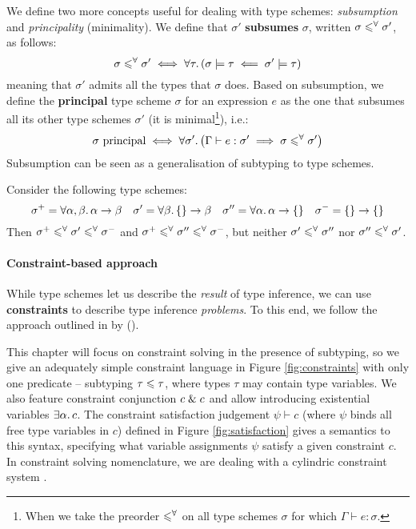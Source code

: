 We define two more concepts useful for dealing with type schemes: \emph{subsumption} and \emph{principality} (minimality). We define that $\sigma'$ \textbf{subsumes} $\sigma$, written $\sigma \leqslant^\forall \sigma'$, as follows:
$$ \sigma \leqslant^\forall \sigma' \iff \forall \tau \ldotp (\sigma \models \tau \impliedby \sigma' \models \tau) $$
meaning that $\sigma'$ admits all the types that $\sigma$ does.
Based on subsumption, we define the \textbf{principal} type scheme $\sigma$ for an expression $e$ as the one that subsumes all its other type schemes $\sigma'$ (it is minimal\footnote{When we take the preorder $\leqslant^\forall$ on all type schemes $\sigma$ for which $\Gamma \vdash e : \sigma$.}), i.e.\@:
$$ \sigma\text{ principal} \iff \forall \sigma' \ldotp \left( \Gamma \vdash e : \sigma' \implies \sigma \subsume \sigma' \right) $$
Subsumption can be seen as a generalisation of subtyping to type schemes.
\begin{example}
Consider the following type schemes:
$$    \sigma^+ = \forall \alpha, \beta \ldotp \alpha \to \beta
\quad \sigma' = \forall \beta \ldotp \flrec{} \to \beta 
\quad \sigma'' = \forall \alpha \ldotp \alpha \to \flrec{} 
\quad \sigma^- = \flrec{} \to \flrec{} $$
Then $\sigma^+ \leqslant^\forall \sigma' \leqslant^\forall \sigma^-$ and $\sigma^+ \leqslant^\forall \sigma'' \leqslant^\forall \sigma^-$, but neither $\sigma' \leqslant^\forall \sigma''$ nor $\sigma'' \leqslant^\forall \sigma'$. 
\end{example}

\paragraph{Constraint-based approach} While type schemes let us describe the \emph{result} of type inference, we can use \textbf{constraints} to describe type inference \emph{problems}. To this end, we follow the approach outlined in  by \textcite{essence-of-ml-type-inference} (\textcite[Chapter~10]{adv-tapl}).

This chapter will focus on constraint solving in the presence of subtyping, so we give an adequately simple constraint language in Figure \ref{fig:constraints} with only one predicate -- subtyping $\tau \leqslant \tau$, where types $\tau$ may contain type variables. We also feature constraint conjunction $c \;\&\; c$ and allow introducing existential variables $\exists \alpha \ldotp c$. The constraint satisfaction judgement $\psi \vdash c$ (where $\psi$ binds all free type variables in $c$) defined in Figure \ref{fig:satisfaction} gives a semantics to this syntax, specifying what variable assignments $\psi$ satisfy a given constraint $c$. In constraint solving nomenclature, we are dealing with a cylindric constraint system \cite{constraint-based-hm}. 


